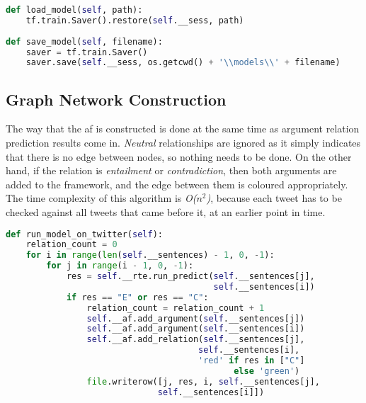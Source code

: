            \begin{lstlisting}[language=Python, caption=Saving and Loading Functions, label=code:lstmsaveload]
def load_model(self, path):
    tf.train.Saver().restore(self.__sess, path)
    
def save_model(self, filename):
    saver = tf.train.Saver()
    saver.save(self.__sess, os.getcwd() + '\\models\\' + filename)
            \end{lstlisting}
    
    \subsection{Graph Network Construction} \label{graphnetwork}
        The way that the \gls{af} is constructed is done at the same time as argument relation prediction results come in. \textit{Neutral} relationships are ignored as it simply indicates that there is no edge between nodes, so nothing needs to be done. On the other hand, if the relation is \textit{entailment} or \textit{contradiction}, then both arguments are added to the framework, and the edge between them is coloured appropriately. The time complexity of this algorithm is \textit{O(}$n^2$\textit{)}, because each tweet has to be checked against all tweets that came before it, at an earlier point in time.
        
        \begin{lstlisting}[language=Python, caption=Constructing Directed Graph from Results, label=code:lstmdigraph]
def run_model_on_twitter(self):
    relation_count = 0
    for i in range(len(self.__sentences) - 1, 0, -1):
        for j in range(i - 1, 0, -1):
            res = self.__rte.run_predict(self.__sentences[j], 
                                         self.__sentences[i])
            if res == "E" or res == "C":
                relation_count = relation_count + 1
                self.__af.add_argument(self.__sentences[j])
                self.__af.add_argument(self.__sentences[i])
                self.__af.add_relation(self.__sentences[j], 
                                      self.__sentences[i],
                                      'red' if res in ["C"] 
                                             else 'green')
                file.writerow([j, res, i, self.__sentences[j],
                              self.__sentences[i]])
        \end{lstlisting}
            
